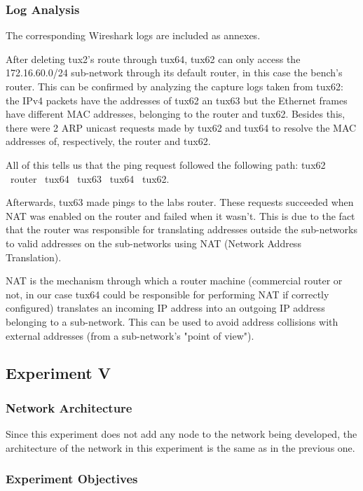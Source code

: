 \documentclass[11pt,a4paper,twocolumn]{article}
\begin{document}
\subsubsection{Log Analysis}

The corresponding Wireshark logs are included as annexes.

After deleting tux2's route through tux64, tux62 can only access the 172.16.60.0/24 sub-network through its default router, in this case the bench's router.
This can be confirmed by analyzing the capture logs taken from tux62: the IPv4 packets have the addresses of tux62 an tux63 but the Ethernet frames have different MAC addresses, belonging to the router and tux62.
Besides this, there were 2 ARP unicast requests made by tux62 and tux64 to resolve the MAC addresses of, respectively, the router and tux62.

All of this tells us that the ping request followed the following path: tux62 \textrightarrow\ router \textrightarrow\ tux64 \textrightarrow\ tux63 \textrightarrow\ tux64 \textrightarrow\ tux62.

Afterwards, tux63 made pings to the labs router. These requests succeeded when NAT was enabled on the router and failed when it wasn't. This is due to the fact that the router was responsible for translating addresses outside the sub-networks to valid addresses on the sub-networks using NAT (Network Address Translation).

NAT is the mechanism through which a router machine (commercial router or not, in our case tux64 could be responsible for performing NAT if correctly configured) translates an incoming IP address into an outgoing IP address belonging to a sub-network. This can be used to avoid address collisions with external addresses (from a sub-network's "point of view").

\subsection{Experiment V}

\subsubsection{Network Architecture}

Since this experiment does not add any node to the network being developed, the architecture of the network in this experiment is the same as in the previous one.

\subsubsection{Experiment Objectives}
\end{document}
